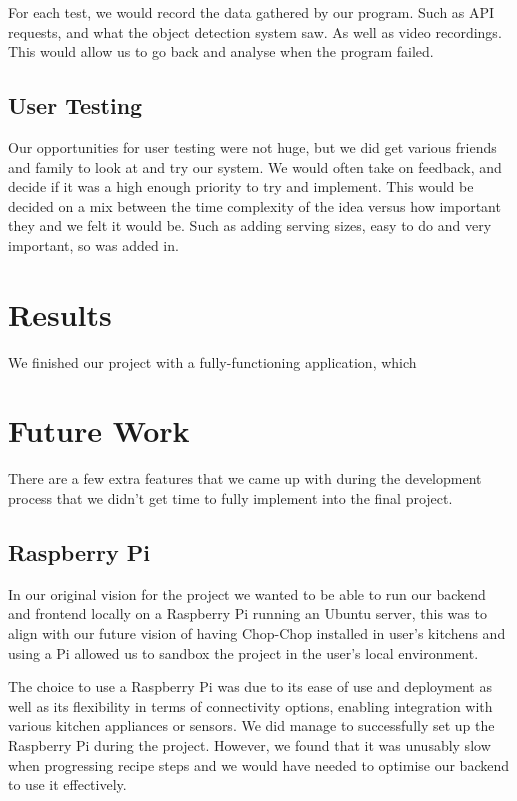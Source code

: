 \documentclass{article}
\begin{document}
For each test, we would record the data gathered by our program. Such as API requests, and what the object detection system saw. As well as video recordings. This would allow us to go back and analyse when the program failed. 

\subsection{User Testing}
Our opportunities for user testing were not huge, but we did get various friends and family to look at and try our system. We would often take on feedback, and decide if it was a high enough priority to try and implement. This would be decided on a mix between the time complexity of the idea versus how important they and we felt it would be. Such as adding serving sizes, easy to do and very important, so was added in.

\section{Results}
We finished our project with a fully-functioning application, which

\section{Future Work}
There are a few extra features that we came up with during the development process that we didn’t get time to fully implement into the final project.
\subsection{Raspberry Pi}
In our original vision for the project we wanted to be able to run our backend and frontend locally on a Raspberry Pi running an Ubuntu server, this was to align with our future vision of having Chop-Chop installed in user's kitchens and using a Pi allowed us to sandbox the project in the user's local environment.

The choice to use a Raspberry Pi was due to its ease of use and deployment as well as its flexibility in terms of connectivity options, enabling integration with various kitchen appliances or sensors. We did manage to successfully set up the Raspberry Pi during the project. However, we found that it was unusably slow when progressing recipe steps and we would have needed to optimise our backend to use it effectively.
\end{document}
